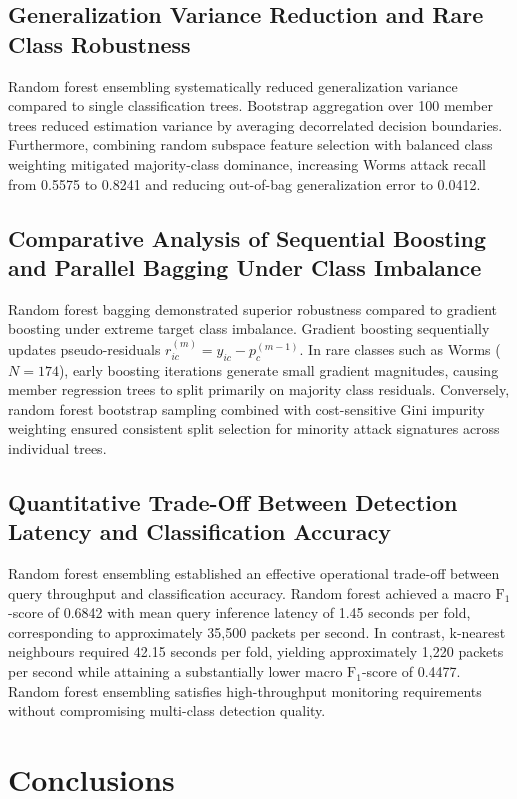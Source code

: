\documentclass[10pt,conference,compsoc]{IEEEtran}
\begin{document}
\subsection{Generalization Variance Reduction and Rare Class Robustness}
Random forest ensembling systematically reduced generalization variance compared to single classification trees. Bootstrap aggregation over 100 member trees reduced estimation variance by averaging decorrelated decision boundaries. Furthermore, combining random subspace feature selection with balanced class weighting mitigated majority-class dominance, increasing Worms attack recall from 0.5575 to 0.8241 and reducing out-of-bag generalization error to 0.0412.

\subsection{Comparative Analysis of Sequential Boosting and Parallel Bagging Under Class Imbalance}
Random forest bagging demonstrated superior robustness compared to gradient boosting under extreme target class imbalance. Gradient boosting sequentially updates pseudo-residuals $r_{ic}^{(m)} = y_{ic} - p_c^{(m-1)}$. In rare classes such as Worms ($N=174$), early boosting iterations generate small gradient magnitudes, causing member regression trees to split primarily on majority class residuals. Conversely, random forest bootstrap sampling combined with cost-sensitive Gini impurity weighting ensured consistent split selection for minority attack signatures across individual trees.

\subsection{Quantitative Trade-Off Between Detection Latency and Classification Accuracy}
Random forest ensembling established an effective operational trade-off between query throughput and classification accuracy. Random forest achieved a macro $\text{F}_1$-score of 0.6842 with mean query inference latency of 1.45 seconds per fold, corresponding to approximately 35,500 packets per second. In contrast, k-nearest neighbours required 42.15 seconds per fold, yielding approximately 1,220 packets per second while attaining a substantially lower macro $\text{F}_1$-score of 0.4477. Random forest ensembling satisfies high-throughput monitoring requirements without compromising multi-class detection quality.

\section{Conclusions}
\end{document}
